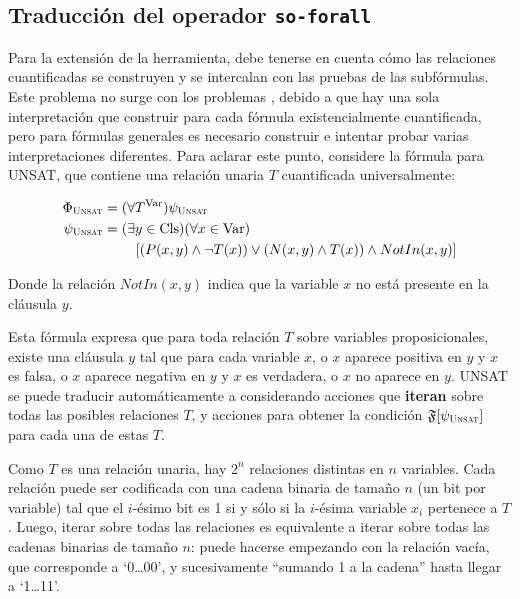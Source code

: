 

\subsection{Traducción del operador \texttt{so-forall}}
Para la extensión de la herramienta, debe tenerse en cuenta cómo las relaciones
cuantificadas se construyen y se intercalan con las pruebas de las subfórmulas.
Este problema no surge con los problemas \SOE, debido a que hay una sola
interpretación que construir para cada fórmula existencialmente cuantificada,
pero para fórmulas generales es necesario construir e intentar probar varias
interpretaciones diferentes.
Para aclarar este punto, considere la fórmula para UNSAT, que contiene una
relación unaria $T$ cuantificada universalmente:

\begin{alignat*}{1}
\Phi_{\textsc{Unsat}} &= (\forall T^\text{Var})\psi_{\textsc{Unsat}} \\
\psi_{\textsc{Unsat}} &= (\exists y\in\text{Cls})(\forall x\in\text{Var}) \\
            &\quad\quad\ [(P(x,y) \land \neg T(x))\lor(N(x,y)\land T(x))\land NotIn(x,y)]
\end{alignat*}

Donde la relación $NotIn(x,y)$ indica que la variable $x$ no está presente en la cláusula $y$.

Esta fórmula expresa que para toda relación $T$ sobre variables
proposicionales, existe una cláusula $y$ tal que para cada variable $x$, o $x$
aparece positiva en $y$ y $x$ es falsa, o $x$ aparece negativa en $y$ y $x$ es
verdadera, o $x$ no aparece en $y$.
UNSAT se puede traducir automáticamente a \STRIPS considerando acciones que
\textbf{iteran} sobre todas las posibles relaciones $T$, y acciones para
obtener la condición $\mathfrak{F}[\psi_{\textsc{Unsat}}]$ para cada una de estas $T$.

Como $T$ es una relación unaria, hay $2^n$ relaciones distintas en $n$
variables. Cada relación puede ser codificada con una cadena binaria
de tamaño $n$ (un bit por variable) tal que el $i$-ésimo bit es 1 si y sólo si
la $i$-ésima variable $x_i$ pertenece a $T$. Luego, iterar sobre todas las
relaciones es equivalente a iterar sobre todas las cadenas binarias de tamaño
$n$: puede hacerse empezando con la relación vacía, que corresponde a
`0\ldots00', y sucesivamente ``sumando 1 a la cadena'' hasta llegar a `1\ldots11'.

